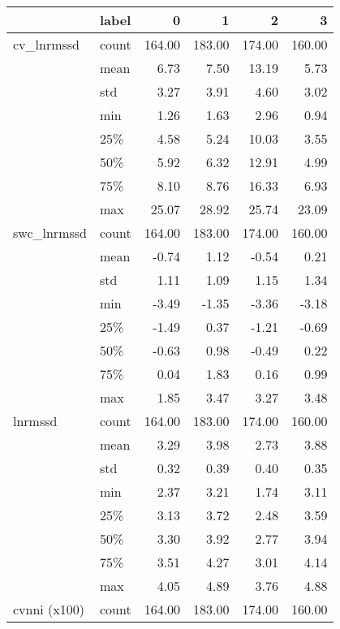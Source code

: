\begin{tabular}{llrrrr}
\toprule
        & label &       0 &       1 &       2 &       3 \\
\midrule
cv\_lnrmssd & count &  164.00 &  183.00 &  174.00 &  160.00 \\
        & mean &    6.73 &    7.50 &   13.19 &    5.73 \\
        & std &    3.27 &    3.91 &    4.60 &    3.02 \\
        & min &    1.26 &    1.63 &    2.96 &    0.94 \\
        & 25\% &    4.58 &    5.24 &   10.03 &    3.55 \\
        & 50\% &    5.92 &    6.32 &   12.91 &    4.99 \\
        & 75\% &    8.10 &    8.76 &   16.33 &    6.93 \\
        & max &   25.07 &   28.92 &   25.74 &   23.09 \\
swc\_lnrmssd & count &  164.00 &  183.00 &  174.00 &  160.00 \\
        & mean &   -0.74 &    1.12 &   -0.54 &    0.21 \\
        & std &    1.11 &    1.09 &    1.15 &    1.34 \\
        & min &   -3.49 &   -1.35 &   -3.36 &   -3.18 \\
        & 25\% &   -1.49 &    0.37 &   -1.21 &   -0.69 \\
        & 50\% &   -0.63 &    0.98 &   -0.49 &    0.22 \\
        & 75\% &    0.04 &    1.83 &    0.16 &    0.99 \\
        & max &    1.85 &    3.47 &    3.27 &    3.48 \\
lnrmssd & count &  164.00 &  183.00 &  174.00 &  160.00 \\
        & mean &    3.29 &    3.98 &    2.73 &    3.88 \\
        & std &    0.32 &    0.39 &    0.40 &    0.35 \\
        & min &    2.37 &    3.21 &    1.74 &    3.11 \\
        & 25\% &    3.13 &    3.72 &    2.48 &    3.59 \\
        & 50\% &    3.30 &    3.92 &    2.77 &    3.94 \\
        & 75\% &    3.51 &    4.27 &    3.01 &    4.14 \\
        & max &    4.05 &    4.89 &    3.76 &    4.88 \\
cvnni (x100) & count &  164.00 &  183.00 &  174.00 &  160.00 \\

\end{tabular}
